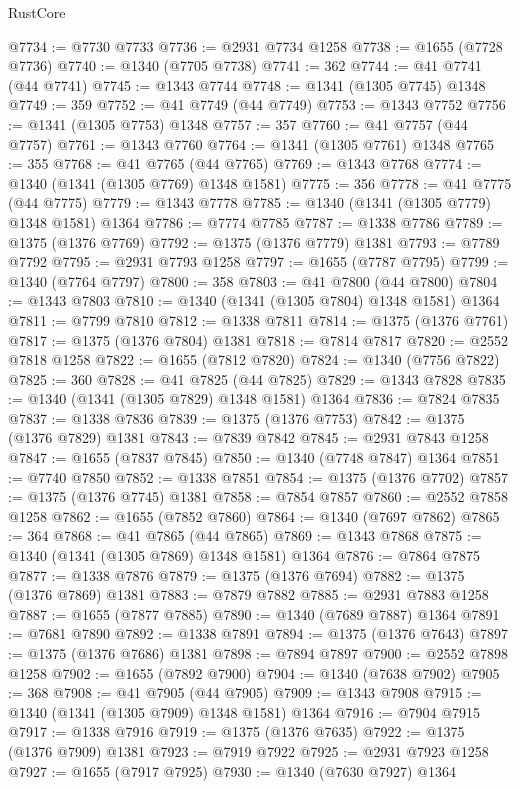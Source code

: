 \begin{lexlean}{RustCore}
\begin{coremodule}
@7734 := @7730 @7733
@7736 := @2931 @7734 @1258
@7738 := @1655 (@7728 @7736)
@7740 := @1340 (@7705 @7738)
@7741 := 362
@7744 := @41 @7741 (@44 @7741)
@7745 := @1343 @7744
@7748 := @1341 (@1305 @7745) @1348
@7749 := 359
@7752 := @41 @7749 (@44 @7749)
@7753 := @1343 @7752
@7756 := @1341 (@1305 @7753) @1348
@7757 := 357
@7760 := @41 @7757 (@44 @7757)
@7761 := @1343 @7760
@7764 := @1341 (@1305 @7761) @1348
@7765 := 355
@7768 := @41 @7765 (@44 @7765)
@7769 := @1343 @7768
@7774 := @1340 (@1341 (@1305 @7769) @1348 @1581)
@7775 := 356
@7778 := @41 @7775 (@44 @7775)
@7779 := @1343 @7778
@7785 := @1340 (@1341 (@1305 @7779) @1348 @1581) @1364
@7786 := @7774 @7785
@7787 := @1338 @7786
@7789 := @1375 (@1376 @7769)
@7792 := @1375 (@1376 @7779) @1381
@7793 := @7789 @7792
@7795 := @2931 @7793 @1258
@7797 := @1655 (@7787 @7795)
@7799 := @1340 (@7764 @7797)
@7800 := 358
@7803 := @41 @7800 (@44 @7800)
@7804 := @1343 @7803
@7810 := @1340 (@1341 (@1305 @7804) @1348 @1581) @1364
@7811 := @7799 @7810
@7812 := @1338 @7811
@7814 := @1375 (@1376 @7761)
@7817 := @1375 (@1376 @7804) @1381
@7818 := @7814 @7817
@7820 := @2552 @7818 @1258
@7822 := @1655 (@7812 @7820)
@7824 := @1340 (@7756 @7822)
@7825 := 360
@7828 := @41 @7825 (@44 @7825)
@7829 := @1343 @7828
@7835 := @1340 (@1341 (@1305 @7829) @1348 @1581) @1364
@7836 := @7824 @7835
@7837 := @1338 @7836
@7839 := @1375 (@1376 @7753)
@7842 := @1375 (@1376 @7829) @1381
@7843 := @7839 @7842
@7845 := @2931 @7843 @1258
@7847 := @1655 (@7837 @7845)
@7850 := @1340 (@7748 @7847) @1364
@7851 := @7740 @7850
@7852 := @1338 @7851
@7854 := @1375 (@1376 @7702)
@7857 := @1375 (@1376 @7745) @1381
@7858 := @7854 @7857
@7860 := @2552 @7858 @1258
@7862 := @1655 (@7852 @7860)
@7864 := @1340 (@7697 @7862)
@7865 := 364
@7868 := @41 @7865 (@44 @7865)
@7869 := @1343 @7868
@7875 := @1340 (@1341 (@1305 @7869) @1348 @1581) @1364
@7876 := @7864 @7875
@7877 := @1338 @7876
@7879 := @1375 (@1376 @7694)
@7882 := @1375 (@1376 @7869) @1381
@7883 := @7879 @7882
@7885 := @2931 @7883 @1258
@7887 := @1655 (@7877 @7885)
@7890 := @1340 (@7689 @7887) @1364
@7891 := @7681 @7890
@7892 := @1338 @7891
@7894 := @1375 (@1376 @7643)
@7897 := @1375 (@1376 @7686) @1381
@7898 := @7894 @7897
@7900 := @2552 @7898 @1258
@7902 := @1655 (@7892 @7900)
@7904 := @1340 (@7638 @7902)
@7905 := 368
@7908 := @41 @7905 (@44 @7905)
@7909 := @1343 @7908
@7915 := @1340 (@1341 (@1305 @7909) @1348 @1581) @1364
@7916 := @7904 @7915
@7917 := @1338 @7916
@7919 := @1375 (@1376 @7635)
@7922 := @1375 (@1376 @7909) @1381
@7923 := @7919 @7922
@7925 := @2931 @7923 @1258
@7927 := @1655 (@7917 @7925)
@7930 := @1340 (@7630 @7927) @1364

\end{coremodule}
\end{lexlean}
